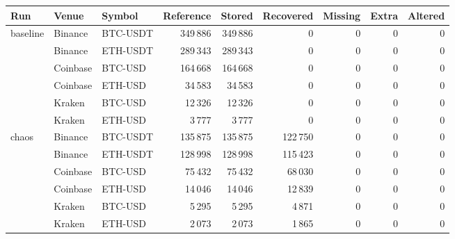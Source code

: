 \begin{tabular}{lllrrrrrr}
\toprule
Run & Venue & Symbol & Reference & Stored & Recovered & Missing & Extra & Altered \\
\midrule
baseline & Binance & BTC-USDT & 349\,886 & 349\,886 & 0 & 0 & 0 & 0 \\
 & Binance & ETH-USDT & 289\,343 & 289\,343 & 0 & 0 & 0 & 0 \\
 & Coinbase & BTC-USD & 164\,668 & 164\,668 & 0 & 0 & 0 & 0 \\
 & Coinbase & ETH-USD & 34\,583 & 34\,583 & 0 & 0 & 0 & 0 \\
 & Kraken & BTC-USD & 12\,326 & 12\,326 & 0 & 0 & 0 & 0 \\
 & Kraken & ETH-USD & 3\,777 & 3\,777 & 0 & 0 & 0 & 0 \\
\midrule
chaos & Binance & BTC-USDT & 135\,875 & 135\,875 & 122\,750 & 0 & 0 & 0 \\
 & Binance & ETH-USDT & 128\,998 & 128\,998 & 115\,423 & 0 & 0 & 0 \\
 & Coinbase & BTC-USD & 75\,432 & 75\,432 & 68\,030 & 0 & 0 & 0 \\
 & Coinbase & ETH-USD & 14\,046 & 14\,046 & 12\,839 & 0 & 0 & 0 \\
 & Kraken & BTC-USD & 5\,295 & 5\,295 & 4\,871 & 0 & 0 & 0 \\
 & Kraken & ETH-USD & 2\,073 & 2\,073 & 1\,865 & 0 & 0 & 0 \\
\bottomrule
\end{tabular}
